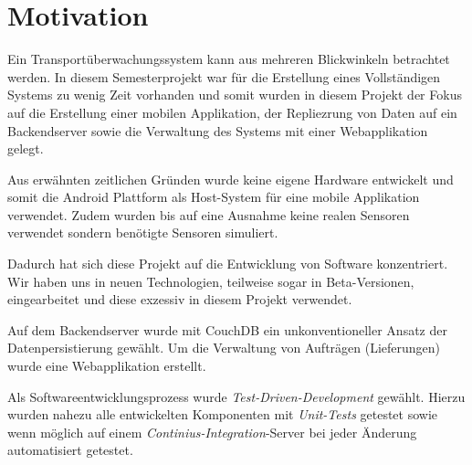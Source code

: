 \section{Motivation}

Ein Transportüberwachungssystem kann aus mehreren Blickwinkeln betrachtet werden.
	In diesem Semesterprojekt war für die Erstellung eines Vollständigen
	Systems zu wenig Zeit vorhanden und somit wurden in diesem Projekt der Fokus
	auf die Erstellung einer mobilen Applikation, der Repliezrung von Daten auf
	ein Backendserver sowie die Verwaltung des Systems mit einer Webapplikation
	gelegt.
	
Aus erwähnten zeitlichen Gründen wurde keine eigene Hardware entwickelt und somit
	die Android Plattform als Host-System für eine mobile Applikation verwendet.
	Zudem wurden bis auf eine Ausnahme keine realen Sensoren verwendet sondern
	benötigte Sensoren simuliert.

Dadurch hat sich diese Projekt auf die Entwicklung von Software konzentriert.
	Wir haben uns in neuen Technologien, teilweise sogar in Beta-Versionen,
	eingearbeitet und diese exzessiv in diesem Projekt verwendet.
	
Auf dem Backendserver wurde mit CouchDB ein unkonventioneller Ansatz der
	Datenpersistierung gewählt. Um die Verwaltung von Aufträgen (Lieferungen)
	wurde eine Webapplikation erstellt.

Als Softwareentwicklungsprozess wurde \emph{Test-Driven-Development} gewählt.
	Hierzu wurden nahezu alle entwickelten Komponenten mit \emph{Unit-Tests}
	getestet sowie wenn möglich auf einem \emph{Continius-Integration}-Server
	bei jeder Änderung automatisiert getestet.